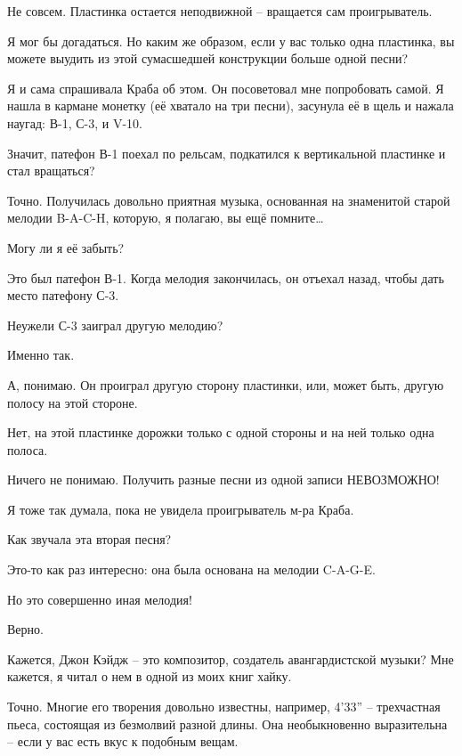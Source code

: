 \documentclass[../main.tex]{subfiles}
\begin{document}
\begin{dialogue}
 Не совсем. Пластинка остается неподвижной \--- вращается сам проигрыватель.

 Я мог бы догадаться. Но каким же образом, если у вас только одна пластинка, вы можете выудить из этой сумасшедшей конструкции больше одной песни?

 Я и сама спрашивала Краба об этом. Он посоветовал мне попробовать самой. Я нашла в кармане монетку (её хватало на три песни), засунула её в щель и нажала наугад: В-1, С-3, и V-10.

 Значит, патефон В-1 поехал по рельсам, подкатился к вертикальной пластинке и стал вращаться?

 Точно. Получилась довольно приятная музыка, основанная на знаменитой старой мелодии \mbox{B-A-C-H}, которую, я полагаю, вы ещё помните\ldots{}

 Могу ли я её забыть?

 Это был патефон В-1. Когда мелодия закончилась, он отъехал назад, чтобы дать место патефону С-3.

 Неужели С-3 заиграл другую мелодию?

 Именно так.

 А, понимаю. Он проиграл другую сторону пластинки, или, может быть, другую полосу на этой стороне.

 Нет, на этой пластинке дорожки только с одной стороны и на ней только одна полоса.

 Ничего не понимаю. Получить разные песни из одной записи НЕВОЗМОЖНО!

 Я тоже так думала, пока не увидела проигрыватель м-ра Краба.

 Как звучала эта вторая песня?

 Это-то как раз интересно: она была основана на мелодии \mbox{C-A-G-E}.

 Но это совершенно иная мелодия!

 Верно.

 Кажется, Джон Кэйдж \--- это композитор, создатель авангардистской музыки? Мне кажется, я читал о нем в одной из моих книг хайку.

 Точно. Многие его творения довольно известны, например, 4'33'' \--- трехчастная пьеса, состоящая из безмолвий разной длины. Она необыкновенно выразительна \--- если у вас есть вкус к подобным вещам.


\end{dialogue}
\end{document}
